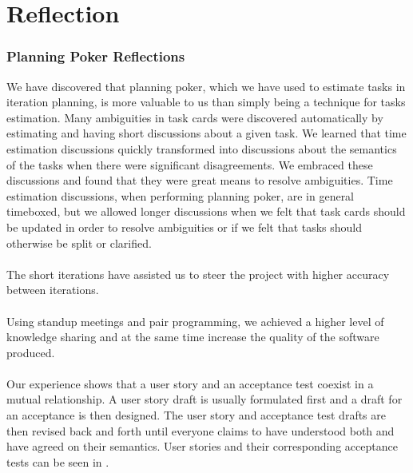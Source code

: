
\chapter{Reflection}
\label{cha:reflection}

\subsection{Planning Poker Reflections}
We have discovered that planning poker, which we have used to estimate tasks in iteration planning, is more valuable to us than simply being a technique for tasks estimation. Many ambiguities in task cards were discovered automatically by estimating and having short discussions about a given task. We learned that time estimation discussions quickly transformed into discussions about the semantics of the tasks when there were significant disagreements. We embraced these discussions and found that they were great means to resolve ambiguities. Time estimation discussions, when performing planning poker, are in general timeboxed, but we allowed longer discussions when we felt that task cards should be updated in order to resolve ambiguities or if we felt that tasks should otherwise be split or clarified.
\\\\
The short iterations have assisted us to steer the project with higher accuracy between iterations. 
\\\\
Using standup meetings and pair programming, we achieved a higher level of knowledge sharing and at the same time increase the quality of the software produced. 
\\\\
Our experience shows that a user story and an acceptance test coexist in a mutual relationship. A user story draft is usually formulated first and a draft for an acceptance is then designed. The user story and acceptance test drafts are then revised back and forth until everyone claims to have understood both and have agreed on their semantics. User stories and their corresponding acceptance tests can be seen in .

